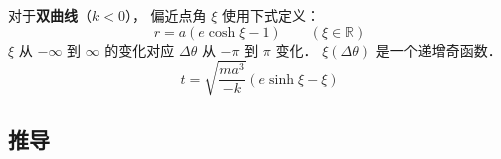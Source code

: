 对于\textbf{双曲线}（$k<0$）， 偏近点角 $\xi$ 使用下式定义：
\begin{equation}\label{EqMoKp_eq2} %
r = a(e\cosh\xi - 1) \qquad (\xi \in \mathbb R)
\end{equation}
$\xi$ 从 $-\infty$ 到 $\infty$ 的变化对应 $\Delta\theta$ 从 $-\pi$ 到 $\pi$ 变化． $\xi(\Delta\theta)$ 是一个递增奇函数．
\begin{equation}\label{EqMoKp_eq4}
t = \sqrt{\frac{ma^3}{-k}} (e\sinh\xi - \xi)
\end{equation}



\subsection{推导}
